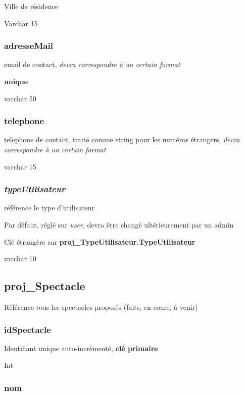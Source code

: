 Ville de résidence

Varchar 15

\subsubsection{adresseMail}\label{adressemail}

email de contact, \emph{devra correspondre à un certain format}

\textbf{unique}

varchar 50

\subsubsection{telephone}\label{telephone}

telephone de contact, traité comme string pour les numéros étrangers,
\emph{devra correspondre à un certain format}

varchar 15

\subsubsection{\texorpdfstring{\emph{typeUtilisateur}}{typeUtilisateur}}\label{typeutilisateur-1}

référence le type d'utilisateur

Par défaut, réglé sur \emph{user}, devra être changé ultérieurement par
un admin

Clé étrangère sur \textbf{proj\_TypeUtilisateur.TypeUtilisateur}

varchar 10

\subsection{proj\_Spectacle}\label{projux5fspectacle}

Référence tous les spectacles proposés (faits, en cours, à venir)

\subsubsection{\texorpdfstring{\textbf{idSpectacle}}{idSpectacle}}\label{idspectacle}

Identifiant unique auto-incrémenté, \textbf{clé primaire}

Int

\subsubsection{nom}\label{nom-1}


